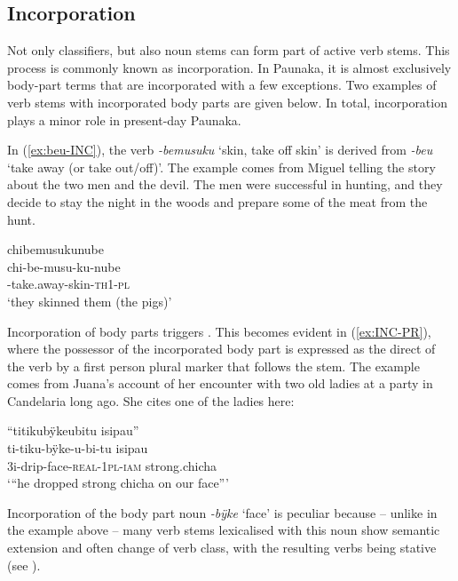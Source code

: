 \subsection{Incorporation}\label{sec:INC_ActiveVerbs}

Not only classifiers, but also noun stems can form part of active verb stems. This process is commonly known as incorporation. In Paunaka, it is almost exclusively body-part terms that are incorporated with a few exceptions. Two examples of verb stems with incorporated body parts are given below. In total, incorporation plays a minor role in present-day Paunaka. 

In (\ref{ex:beu-INC}), the verb \textit{-bemusuku} ‘skin, take off skin’ is derived from \textit{-beu} ‘take away (or take out/off)’. The example comes from Miguel telling the story about the two men and the devil. The men were successful in hunting, and they decide to stay the night in the woods and prepare some of the meat from the hunt.  


\ea\label{ex:beu-INC}
\begingl
\glpreamble chibemusukunube\\
\gla chi-be-musu-ku-nube\\
-take.away-skin-\textsc{th}1-\textsc{pl}\\
\glft ‘they skinned them (the pigs)’
\endgl
\trailingcitation{[mxx-n101017s-1.016]}
\xe

Incorporation of body parts triggers . This becomes evident in (\ref{ex:INC-PR}), where the possessor of the incorporated body part is expressed as the direct  of the verb by a first person plural marker that follows the stem. The example comes from Juana’s account of her encounter with two old ladies at a party in Candelaria long ago. She cites one of the ladies here:

\ea\label{ex:INC-PR}
\begingl
\glpreamble “titikubÿkeubitu isipau”\\
\gla ti-tiku-bÿke-u-bi-tu isipau\\
\glb 3i-drip-face-\textsc{real}-1\textsc{pl}-\textsc{iam} strong.chicha\\
\glft ‘“he dropped strong chicha on our face”’
\endgl
\trailingcitation{[jxx-p120515l-1.073]}
\xe

Incorporation of the body part noun \textit{-bÿke} ‘face’ is peculiar because – unlike in the example above – many verb stems lexicalised with this noun show semantic extension and often change of verb class, with the resulting verbs being stative (see ).

